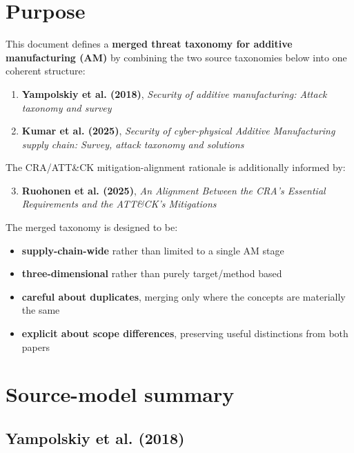 \documentclass[10pt,a4paper,oneside]{report}
\begin{document}
\chapter{Purpose}


This document defines a \textbf{merged threat taxonomy for additive manufacturing (AM)} by combining the two source taxonomies below into one coherent structure:

\begin{enumerate}
\item \textbf{Yampolskiy et al. (2018)}, \emph{Security of additive manufacturing: Attack taxonomy and survey}
\item \textbf{Kumar et al. (2025)}, \emph{Security of cyber-physical Additive Manufacturing supply chain: Survey, attack taxonomy and solutions}
\end{enumerate}

The CRA/ATT\&CK mitigation-alignment rationale is additionally informed by:

\begin{enumerate}
\setcounter{enumi}{2}
\item \textbf{Ruohonen et al. (2025)}, \emph{An Alignment Between the CRA's Essential Requirements and the ATT\&CK's Mitigations}
\end{enumerate}

The merged taxonomy is designed to be:

\begin{itemize}
\item \textbf{supply-chain-wide} rather than limited to a single AM stage
\item \textbf{three-dimensional} rather than purely target/method based
\item \textbf{careful about duplicates}, merging only where the concepts are materially the same
\item \textbf{explicit about scope differences}, preserving useful distinctions from both papers
\end{itemize}


\chapter{Source-model summary}



\section{Yampolskiy et al. (2018)}
\end{document}
